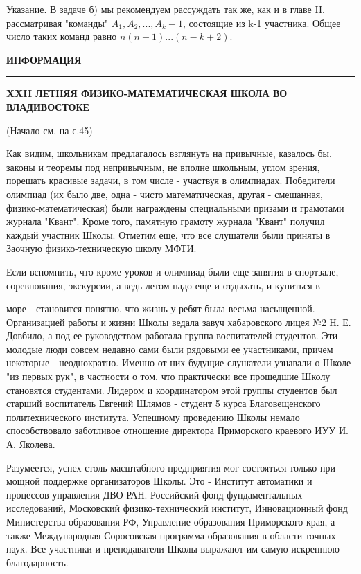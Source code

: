 \documentclass[9pt, a4paper]{article}
\begin{document}
\begin{footnotesize}
\begin{multicols}{3}
Указание. В задаче б) мы рекомендуем рассуждать так же, как и в главе II, рассматривая "команды" $A_1, A_2,..., A_k-1$, состоящие из k-1 участника. Общее число таких команд равно $n(n-1)...(n-k+2)$.
\end{multicols}

\begin{center}
\large{\textbf{ИНФОРМАЦИЯ}}
\end{center}
\hrule
\begin{center}
\large{\textbf{XXII ЛЕТНЯЯ ФИЗИКО-МАТЕМАТИЧЕСКАЯ ШКОЛА ВО ВЛАДИВОСТОКЕ}}
\end{center}

\begin{multicols}{3}

(Начало см. на с.45)

Как видим, школьникам предлагалось взглянуть на привычные, казалось бы, законы и теоремы под непривычным, не вполне школьным, углом зрения, порешать красивые задачи, в том числе - участвуя в олимпиадах. Победители олимпиад (их было две, одна - чисто математическая, другая - смешанная, физико-математическая) были награждены специальными призами и грамотами журнала "Квант". Кроме того, памятную грамоту журнала "Квант" получил каждый участник Школы. Отметим еще, что все слушатели были приняты в Заочную физико-техническую школу МФТИ.

Если вспомнить, что кроме уроков и олимпиад были еще занятия в спортзале, соревнования, экскурсии, а ведь летом надо еще и отдыхать, и купиться в

\columnbreak

море - становится понятно, что жизнь у ребят была весьма насыщенной. Организацией работы и жизни Школы ведала завуч хабаровского лицея №2 Н. Е. Довбило, а под ее руководством работала группа воспитателей-студентов. Эти молодые люди совсем недавно сами были рядовыми ее участниками, причем некоторые - неоднократно. Именно от них будущие слушатели узнавали о Школе "из первых рук", в частности о том, что практически все прошедшие Школу становятся студентами. Лидером и координатором этой группы студентов был старший воспитатель Евгений Шлямов - студент 5 курса Благовещенского политехнического института. Успешному проведению Школы немало способствовало заботливое отношение директора Приморского краевого ИУУ И. А. Яколева.

\columnbreak

Разумеется, успех столь масштабного предприятия мог состояться только при мощной поддержке организаторов Школы. Это - Институт автоматики и процессов управления ДВО РАН. Российский фонд фундаментальных исследований, Московский физико-технический институт, Инновационный фонд Министерства образования РФ, Управление образования Приморского края, а также Международная Соросовская программа образования в области точных наук. Все участники и преподаватели Школы выражают им самую искреннюю благодарность.


\end{multicols}
\end{footnotesize}
\end{document}
